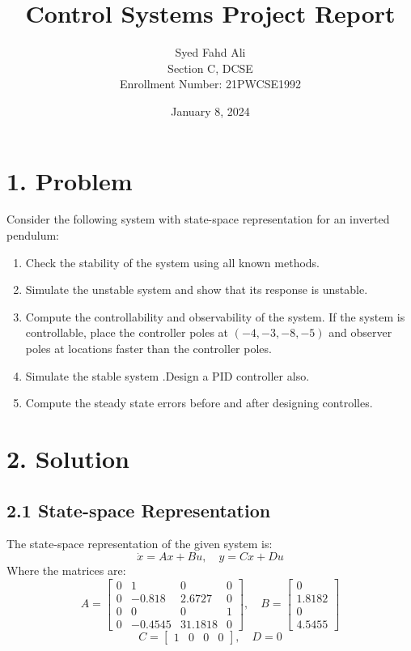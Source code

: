 \documentclass[a4paper,12pt]{article}
\title{Control Systems Project Report}
\author{Syed Fahd Ali \\ Section C, DCSE \\ Enrollment Number: 21PWCSE1992}
\date{January 8, 2024}
\begin{document}
\maketitle

\section*{1. Problem }
Consider the following system with state-space representation for an inverted pendulum:
\begin{enumerate}
    \item Check the stability of the system using all known methods.
    \item Simulate the unstable system and show that its response is unstable.
    \item Compute the controllability and observability of the system. If the system is controllable, place the controller poles at $(-4,-3,-8,-5)$ and observer poles at locations faster than the controller poles.
    \item Simulate the stable system .Design a  PID controller also.
    \item Compute the steady state errors before and after designing controlles.
\end{enumerate}
\section*{2. Solution}

\subsection*{2.1 State-space Representation}
The state-space representation of the given system is:
\[
\dot{x} = Ax + Bu, \quad y = Cx + Du
\]
Where the matrices are:
\[
A = 
\begin{bmatrix}
0 & 1 & 0 & 0 \\ 
0 & -0.818 & 2.6727 & 0 \\ 
0 & 0 & 0 & 1 \\ 
0 & -0.4545 & 31.1818 & 0
\end{bmatrix}, \quad
B = 
\begin{bmatrix}
0 \\ 1.8182 \\ 0 \\ 4.5455
\end{bmatrix}
\]
\[
C = \begin{bmatrix} 1 & 0 & 0 & 0 \end{bmatrix}, \quad
D = 0
\]
\end{document}
